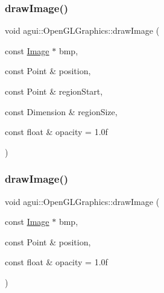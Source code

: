 \subsubsection{\texorpdfstring{draw\+Image()}{drawImage()}\hspace{0.1cm}{\footnotesize\ttfamily [1/2]}}
{\footnotesize\ttfamily void agui\+::\+Open\+G\+L\+Graphics\+::draw\+Image (\begin{DoxyParamCaption}\item[{const \mbox{\hyperlink{class_image}{Image}} $\ast$}]{bmp,  }\item[{const Point \&}]{position,  }\item[{const Point \&}]{region\+Start,  }\item[{const Dimension \&}]{region\+Size,  }\item[{const float \&}]{opacity = {\ttfamily 1.0f} }\end{DoxyParamCaption})\hspace{0.3cm}{\ttfamily [override]}}

\mbox{\label{classagui_1_1_open_g_l_graphics_a1fca808a081e0afe94fe7b94d8f9ed6f}} 
\subsubsection{\texorpdfstring{draw\+Image()}{drawImage()}\hspace{0.1cm}{\footnotesize\ttfamily [2/2]}}
{\footnotesize\ttfamily void agui\+::\+Open\+G\+L\+Graphics\+::draw\+Image (\begin{DoxyParamCaption}\item[{const \mbox{\hyperlink{class_image}{Image}} $\ast$}]{bmp,  }\item[{const Point \&}]{position,  }\item[{const float \&}]{opacity = {\ttfamily 1.0f} }\end{DoxyParamCaption})\hspace{0.3cm}{\ttfamily [override]}}

\mbox{\label{classagui_1_1_open_g_l_graphics_a4123aa29ef3c9610fc121f3e52cb5e60}} 
